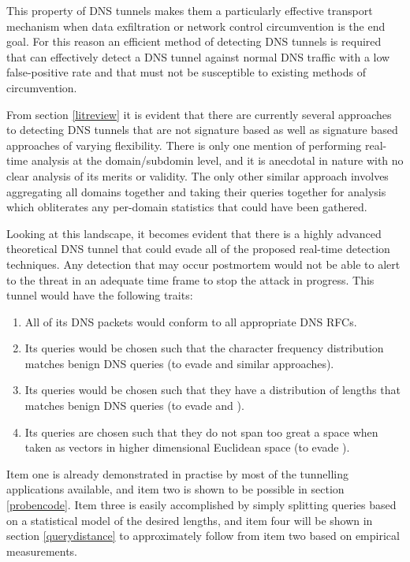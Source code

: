 \documentclass[12pt]{article}
\theoremstyle{remark}
\theoremstyle{definition}
\theoremstyle{definition}
\theoremstyle{definition}
\begin{document}
This property of DNS tunnels makes them a particularly effective transport
mechanism
when data exfiltration or network control circumvention is the end goal. For
this reason an efficient method of detecting DNS tunnels is required that can
effectively detect a DNS tunnel against normal DNS traffic with a low
false-positive rate and that must not be susceptible to existing methods of
circumvention.

From section \ref{litreview} it is evident that there are currently several
approaches to detecting DNS tunnels that are not signature based as well as
signature based approaches of varying flexibility. There is only one mention of
performing real-time analysis at the domain/subdomin level, and it is anecdotal in nature
with no clear analysis of its merits or validity. The only other similar
approach involves aggregating all domains together and taking their queries
together for analysis which obliterates any per-domain statistics that could have been gathered.

Looking at this landscape, it becomes evident that there is a highly advanced theoretical
DNS tunnel that could evade all of the proposed real-time detection techniques.
Any detection that may occur postmortem would not be
able to alert to the threat in an adequate time frame to stop the attack in
progress. This tunnel would have the following traits:

\begin{enumerate}
\item All of its DNS packets would conform to all appropriate DNS RFCs.
\item Its queries would be chosen such that the character frequency distribution
matches benign DNS queries (to evade \cite{Born2010.cfa} and similar approaches).
\item Its queries would be chosen such that they have a distribution of lengths that
matches benign DNS queries (to evade \cite{Karasaridis2006} and \cite{SANS2013}).
\item Its queries are chosen such that they do not span too great a space when taken as vectors in higher dimensional Euclidean space (to evade \cite{jhind2009}).
\end{enumerate}

Item one is already demonstrated in practise by most of the tunnelling
applications available, and item two is shown to be possible in section
\ref{probencode}. Item three is easily accomplished by simply splitting queries based on a statistical model of the desired lengths, and item four will be shown in section \ref{querydistance} to approximately follow from item two based on empirical measurements.
\end{document}
